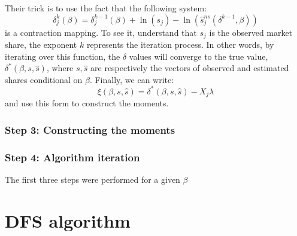 Their trick is to use the fact that the following system: $$\delta_j^k(\beta) = \delta_j^{k-1}(\beta) + \ln(s_j) - \ln(\hat s_j^{ns}(\delta^{k-1}, \beta)) $$ is a contraction mapping. To see it, understand that $s_j$ is the observed market share, the exponent $k$ represents the iteration process. In other words, by iterating over this function, the $\delta$ values will converge to the true value, $\delta^*(\beta, s, \hat s)$, where $s, \hat s$ are respectively the vectors of observed and estimated shares conditional on $\beta$. Finally, we can write: $$\xi(\beta, s, \hat s) = \delta^*(\beta, s, \hat s) - X_j\lambda $$ and use this form to construct the moments.

\subsubsection{Step 3: Constructing the moments}



\subsubsection{Step 4: Algorithm iteration}

The first three steps were performed for a given $\beta$ 

\section{DFS algorithm}


